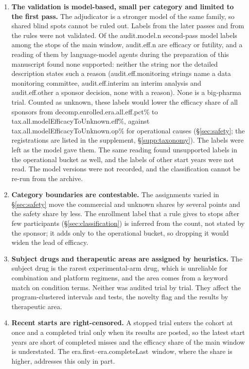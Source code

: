 \documentclass[11pt]{article}
\newcommand{\eracomplete}{\num{era.first}--\num{era.completeLast}}
\begin{document}
\begin{enumerate}[leftmargin=*]
\item\label{lim:validation} \textbf{The validation is model-based, small per category and limited to the first pass.} The adjudicator is a stronger model of the same family, so shared blind spots cannot be ruled out. Labels from the later passes and from the rules were not validated. Of the \num{audit.model.n} second-pass model labels among the stops of the main window, \num{audit.eff.n} are efficacy or futility, and a reading of them by language-model agents during the preparation of this manuscript found none supported: neither the string nor the detailed description states such a reason (\num{audit.eff.monitoring} strings name a data monitoring committee, \num{audit.eff.interim} an interim analysis and \num{audit.eff.other} a sponsor decision, none with a reason). None is a big-pharma trial. Counted as unknown, these labels would lower the efficacy share of all sponsors from \num{decomp.enrolled.era.all.eff.pct}\% to \num{tax.all.modelEfficacyToUnknown.eff}\%, against \num{tax.all.modelEfficacyToUnknown.op}\% for operational causes (\S\ref{sec:safety}; the registrations are listed in the supplement, \S\ref{supp:taxonomy}). The labels were left as the model gave them. The same reading found unsupported labels in the operational bucket as well, and the labels of other start years were not read. The model versions were not recorded, and the classification cannot be re-run from the archive.
\item\label{lim:taxonomy} \textbf{Category boundaries are contestable.} The assignments varied in \S\ref{sec:safety} move the commercial and unknown shares by several points and the safety share by less. The enrollment label that a rule gives to stops after few participants (\S\ref{sec:classification}) is inferred from the count, not stated by the sponsor; it adds only to the operational bucket, so dropping it would widen the lead of efficacy.
\item\label{lim:heuristics} \textbf{Subject drugs and therapeutic areas are assigned by heuristics.} The subject drug is the rarest experimental-arm drug, which is unreliable for combination and platform regimens, and the area comes from a keyword match on condition terms. Neither was audited trial by trial. They affect the program-clustered intervals and tests, the novelty flag and the results by therapeutic area.
\item\label{lim:censoring} \textbf{Recent starts are right-censored.} A stopped trial enters the cohort at once and a completed trial only when its results are posted, so the latest start years are short of completed misses and the efficacy share of the main window is understated. The \eracomplete\ window, where the share is higher, addresses this only in part.

\end{enumerate}
\end{document}
